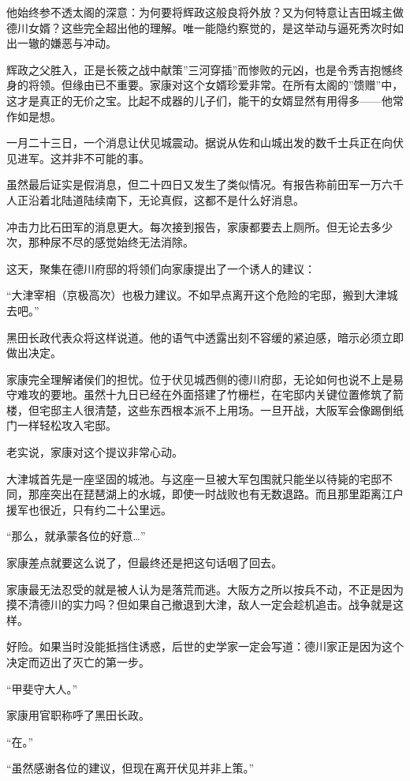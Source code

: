 \documentclass[
]{article}
\begin{document}
他始终参不透太阁的深意：为何要将辉政这般良将外放？又为何特意让吉田城主做德川女婿？这些完全超出他的理解。唯一能隐约察觉的，是这举动与逼死秀次时如出一辙的嫌恶与冲动。

辉政之父胜入，正是长筱之战中献策''三河穿插''而惨败的元凶，也是令秀吉抱憾终身的将领。但缘由已不重要。家康对这个女婿珍爱非常。在所有太阁的''馈赠''中，这才是真正的无价之宝。比起不成器的儿子们，能干的女婿显然有用得多------他常作如是想。

一月二十三日，一个消息让伏见城震动。据说从佐和山城出发的数千士兵正在向伏见进军。这并非不可能的事。

虽然最后证实是假消息，但二十四日又发生了类似情况。有报告称前田军一万六千人正沿着北陆道陆续南下，无论真假，这都不是什么好消息。

冲击力比石田军的消息更大。每次接到报告，家康都要去上厕所。但无论去多少次，那种尿不尽的感觉始终无法消除。

这天，聚集在德川府邸的将领们向家康提出了一个诱人的建议：

``大津宰相（京极高次）也极力建议。不如早点离开这个危险的宅邸，搬到大津城去吧。''

黑田长政代表众将这样说道。他的语气中透露出刻不容缓的紧迫感，暗示必须立即做出决定。

家康完全理解诸侯们的担忧。位于伏见城西侧的德川府邸，无论如何也说不上是易守难攻的要地。虽然十九日已经在外面搭建了竹栅栏，在宅邸内关键位置修筑了箭楼，但宅邸主人很清楚，这些东西根本派不上用场。一旦开战，大阪军会像踢倒纸门一样轻松攻入宅邸。

老实说，家康对这个提议非常心动。

大津城首先是一座坚固的城池。与这座一旦被大军包围就只能坐以待毙的宅邸不同，那座突出在琵琶湖上的水城，即使一时战败也有无数退路。而且那里距离江户援军也很近，只有约二十公里远。

``那么，就承蒙各位的好意\ldots{}''

家康差点就要这么说了，但最终还是把这句话咽了回去。

家康最无法忍受的就是被人认为是落荒而逃。大阪方之所以按兵不动，不正是因为摸不清德川的实力吗？但如果自己撤退到大津，敌人一定会趁机追击。战争就是这样。

好险。如果当时没能抵挡住诱惑，后世的史学家一定会写道：德川家正是因为这个决定而迈出了灭亡的第一步。

``甲斐守大人。''

家康用官职称呼了黑田长政。

``在。''

``虽然感谢各位的建议，但现在离开伏见并非上策。''
\end{document}
